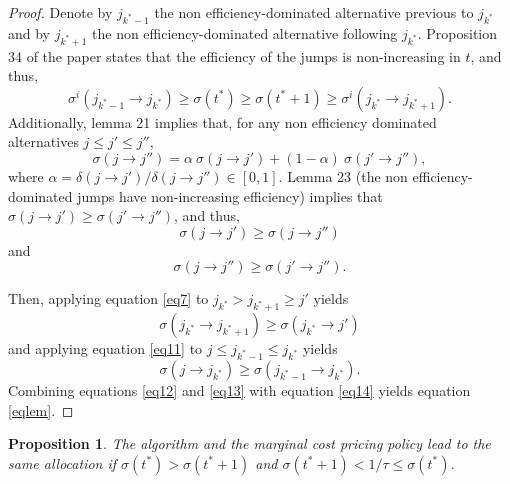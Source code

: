 \documentclass[empty, english]{javaudin}
\newtheorem{propo}{Proposition}
\begin{document}
\begin{proof}
	Denote by $j_{k^{*}-1}$ the non efficiency-dominated alternative previous to $j_{k^{*}}$ and by $j_{k^{*}+1}$ the non efficiency-dominated alternative following $j_{k^{*}}$.
	Proposition 34 of the paper states that the efficiency of the jumps is non-increasing in $t$, and thus,
	\begin{equation}
		\sigma^i(j_{k^{*}-1} \rightarrow j_{k^{*}}) \geq \sigma(t^{*}) \geq \sigma(t^{*} + 1) \geq \sigma^i(j_{k^{*}} \rightarrow j_{k^{*}+1}).
		\label{eq14}
	\end{equation}
	Additionally, lemma 21 implies that, for any non efficiency dominated alternatives $j \leq j' \leq j''$, 
	\begin{equation}
		\sigma(j \rightarrow j'') = \alpha~\sigma(j \rightarrow j') + (1 - \alpha)~\sigma(j' \rightarrow j''), 
		\label{eq6}
	\end{equation}
	where $\alpha = \delta(j \rightarrow j') / \delta(j \rightarrow j'') \in [0, 1]$.
	Lemma 23 (the non efficiency-dominated jumps have non-increasing efficiency) implies that $\sigma(j \rightarrow j') \geq \sigma(j' \rightarrow j'')$, and thus,
	\begin{equation}
		\sigma(j \rightarrow j') \geq \sigma(j \rightarrow j'') 
		\label{eq7}
	\end{equation}
	and
	\begin{equation}
		\sigma(j \rightarrow j'') \geq \sigma(j' \rightarrow j'').
		\label{eq11}
	\end{equation}

	Then, applying equation \eqref{eq7} to $j_{k^{*}} > j_{k^{*}+1} \geq j'$ yields
	\begin{equation}
		\sigma(j_{k^{*}} \rightarrow j_{k^{*}+1}) \geq \sigma(j_{k^{*}} \rightarrow j')
		\label{eq12}
	\end{equation}
	and applying equation \eqref{eq11} to $j \leq j_{k^{*}-1} \leq j_{k^{*}}$ yields
	\begin{equation}
		\sigma(j \rightarrow j_{k^{*}}) \geq \sigma(j_{k^{*}-1} \rightarrow j_{k^{*}}).
		\label{eq13}
	\end{equation}
	Combining equations \eqref{eq12} and \eqref{eq13} with equation \eqref{eq14} yields equation \eqref{eqlem}.
\end{proof}

\begin{propo}
	The algorithm and the marginal cost pricing policy lead to the same allocation if $\sigma(t^{*}) > \sigma(t^{*} + 1)$ and $\sigma(t^{*}+1) < 1 / \tau \leq \sigma(t^{*})$.
	\label{propo2}
\end{propo}
\end{document}
